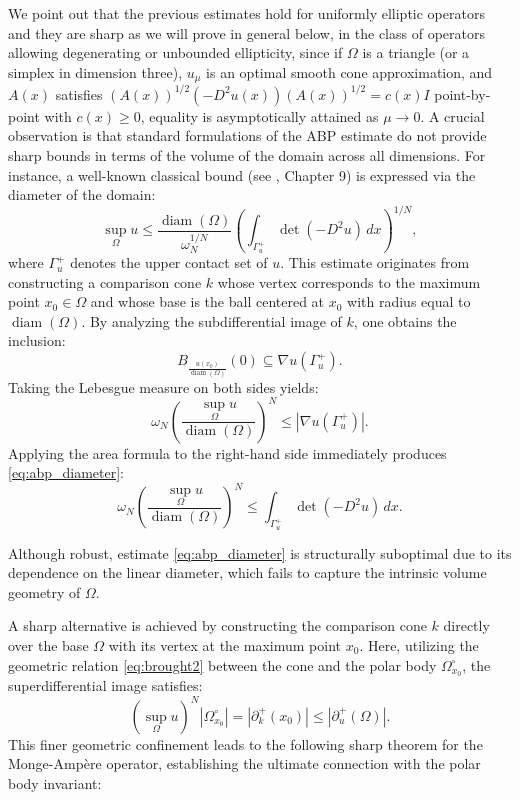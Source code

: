\documentclass[10pt,a4paper]{amsart}
\numberwithin{equation}{section}
\begin{document}
\noindent We point out that the previous estimates hold for uniformly elliptic operators and they are sharp as we will prove in general below, in the class of operators allowing degenerating or unbounded ellipticity, since if $\Omega$ is a triangle (or a simplex in dimension three), $u_\mu$ is an optimal smooth cone approximation, and $A(x)$ satisfies $(A(x))^{1/2}(-D^2u(x))(A(x))^{1/2} = c(x)I$ point-by-point with $c(x) \ge 0$, equality is asymptotically attained as $\mu \rightarrow 0$. A crucial observation is that standard formulations of the ABP estimate do not provide sharp bounds in terms of the volume of the domain across all dimensions. For instance, a well-known classical bound (see \cite{gilbarg2001}, Chapter 9) is expressed via the diameter of the domain:
\begin{equation}\label{eq:abp_diameter}
\sup_\Omega u \le \frac{\operatorname{diam}(\Omega)}{\omega_N^{1/N}} \left( \int_{\Gamma_u^+} \det(-D^2u) \, dx \right)^{1/N},
\end{equation}
where $\Gamma_u^+$ denotes the upper contact set of $u$. This estimate originates from constructing a comparison cone $k$ whose vertex corresponds to the maximum point $x_0 \in \Omega$ and whose base is the ball centered at $x_0$ with radius equal to $\operatorname{diam}(\Omega)$. By analyzing the subdifferential image of $k$, one obtains the inclusion:
\[
B_{\frac{u(x_0)}{\operatorname{diam}(\Omega)}}(0) \subseteq \nabla u(\Gamma_u^+).
\]
Taking the Lebesgue measure on both sides yields:
\[
\omega_N \left( \frac{\sup_\Omega u}{\operatorname{diam}(\Omega)} \right)^N \le |\nabla u(\Gamma_u^+)|.
\]
Applying the area formula to the right-hand side immediately produces \eqref{eq:abp_diameter}:
\[
\omega_N \left( \frac{\sup_\Omega u}{\operatorname{diam}(\Omega)} \right)^N \le \int_{\Gamma_u^+} \det(-D^2u) \, dx.
\] 

\noindent Although robust, estimate \eqref{eq:abp_diameter} is structurally suboptimal due to its dependence on the linear diameter, which fails to capture the intrinsic volume geometry of $\Omega$. 

\noindent A sharp alternative is achieved by constructing the comparison cone $k$ directly over the base $\Omega$ with its vertex at the maximum point $x_0$. Here, utilizing the geometric relation \eqref{eq:brought2} between the cone and the polar body $\Omega_{x_0}^\circ$, the superdifferential image satisfies:
\[
(\sup_\Omega u)^N |\Omega_{x_0}^\circ| = |\partial^+_k(x_0)| \le |\partial^+_u(\Omega)|.
\]
This finer geometric confinement leads to the following sharp theorem for the Monge-Ampère operator, establishing the ultimate connection with the polar body invariant:
\end{document}
